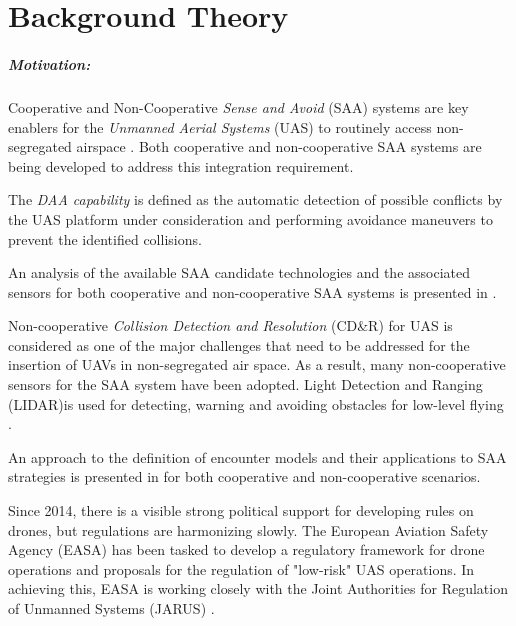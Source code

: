 \cleardoublepage
\chapter{Background Theory}\label{ch:backGroundTheory}

\paragraph{Motivation:} Cooperative and Non-Cooperative \emph{Sense and Avoid} (SAA) systems are key enablers for the \emph{Unmanned Aerial Systems} (UAS) to routinely access non-segregated airspace \cite{spriesterbach2013unmanned}. Both cooperative and non-cooperative SAA systems are being developed to address this integration requirement.

The \emph{DAA capability} is defined as the automatic detection of possible conflicts by the UAS platform under consideration and performing avoidance maneuvers to prevent the identified collisions.

An analysis of the available SAA candidate technologies and the associated sensors for both cooperative and non-cooperative SAA systems is presented in \cite{muraru2011critical}. 

Non-cooperative \emph{Collision Detection and Resolution} (CD\&R) for UAS is considered as one of the major challenges that need to be addressed \cite{lai2012see} for the insertion of UAVs in non-segregated air space. As a result, many non-cooperative sensors for the SAA system have been adopted. Light Detection and Ranging (LIDAR)is used for detecting, warning and avoiding obstacles for low-level flying \cite{sabatini2014lidar}.

An approach to the definition of encounter models and their applications to SAA strategies is presented in \cite{kochenderfer2008encounter} for both cooperative and non-cooperative scenarios.

Since 2014, there is a visible strong political support for developing rules on drones, but regulations are harmonizing slowly. The European Aviation Safety Agency (EASA) has been tasked to develop a regulatory framework for drone operations and proposals for the regulation of "low-risk" UAS operations. In achieving this, EASA is working closely with the Joint Authorities for Regulation of Unmanned Systems (JARUS) \cite{jarus2016regulations}.

